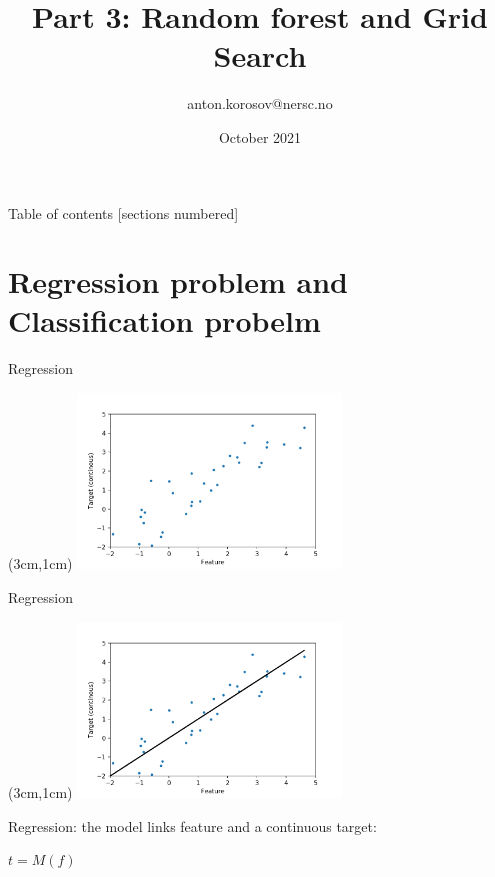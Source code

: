 \documentclass[handout, 10pt]{beamer}
\title[Machine Learning]{Part 3: Random forest and Grid Search}
\author[A. Korosov]{anton.korosov@nersc.no}
\institute[NERSC]{NERSC\\
slides+notebook:\url{https://github.com/nansencenter/nersc_ml_course}}
\date{October 2021}
\begin{document}
\begin{frame}
\titlepage
\end{frame}

\begin{frame}[allowframebreaks]{Table of contents}
  [sections numbered]
  \tableofcontents[hideallsubsections]
\end{frame}

\section{Regression problem and Classification probelm}

\begin{frame}{Regression}
\begin{textblock*}{8cm}(3cm,1cm) %
\includegraphics[width=7cm]{figs/regression_0.png}
\end{textblock*}
\end{frame}

\begin{frame}{Regression}
\begin{textblock*}{8cm}(3cm,1cm) %
\includegraphics[width=7cm]{figs/regression_1.png}

Regression: the model links feature and a continuous target: 

$t = M(f)$
\end{textblock*}
\end{frame}
\end{document}

